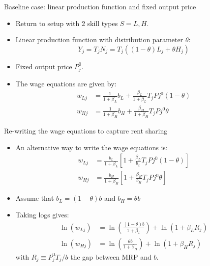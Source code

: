 \documentclass[notes=show]{beamer}
\begin{document}
\begin{frame}{Baseline case: linear production function and fixed output price}
\begin{itemize}
\item Return to setup with 2 skill types $S=L,H$. \medskip
\item Linear production function with distribution parameter $ \theta $: \medskip
\begin{equation*}
    Y_{j} = T_{j} N_{j} = T_{j} ( (1 - \theta) L_{j} + \theta H_{j})
\end{equation*}
\item Fixed output price $ P_{j}^{0}$. \medskip
\item The wage equations are given by:
\begin{align*}
    w_{Lj} & = \frac{1}{1 + \beta_{L}}b_{L} + \frac{\beta_{L}}{1 + \beta_{L}} T_{j} P{j}^{0} (1 - \theta) \\
    w_{Hj} & = \frac{1}{1 + \beta_{H}}b_{H} + \frac{\beta_{H}}{1 + \beta_{H}} T_{j} P{j}^{0} \theta
\end{align*}
\end{itemize}
\end{frame}

\begin{frame}{Re-writing the wage equations to capture rent sharing}
\begin{itemize}
\item An alternative way to write the wage equations is:
\begin{align*}
    w_{Lj} & = \frac{b_{L}}{1 + \beta_{L}} \left[ 1 + \frac{\beta_{L}}{b_{L}} T_{j} P{j}^{0} (1 - \theta) \right] \\
    w_{Hj} & = \frac{b_{H}}{1 + \beta_{H}} \left[ 1 + \frac{\beta_{H}}{b_{H}} T_{j} P{j}^{0} \theta \right]
\end{align*}
\item Assume that $b_{L}=(1-\theta)b$ and $b_{H}=\theta b$ \medskip
\item Taking logs gives:
\begin{align*}
    \ln(w_{Lj}) & = \ln \left( \frac{(1-\theta)b}{1 + \beta_{L}} \right) + \ln (1+\beta_{L}R_{j}) \tag{12} \\
    \ln(w_{Hj}) & = \ln \left( \frac{\theta b}{1 + \beta_{H}} \right) + \ln (1+\beta_{H}R_{j}) \tag{13}
\end{align*}
with $ R_{j} \equiv P_{j}^{0}T_{j}/b$ the gap between MRP and $b$.  
\end{itemize}
\end{frame}
\end{document}
